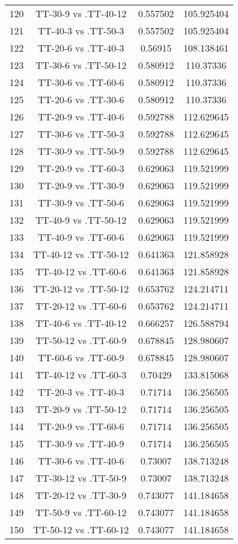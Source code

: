 \documentclass[a4paper,10pt]{article}
\begin{document}
\begin{landscape}
\begin{table}[!htp]
\begin{tabular}{cccc}
120&TT-30-9 vs .TT-40-12&0.557502&105.925404\\
121&TT-40-3 vs .TT-50-3&0.557502&105.925404\\
122&TT-20-6 vs .TT-40-3&0.56915&108.138461\\
123&TT-30-6 vs .TT-50-12&0.580912&110.37336\\
124&TT-30-6 vs .TT-60-6&0.580912&110.37336\\
125&TT-20-6 vs .TT-30-6&0.580912&110.37336\\
126&TT-20-9 vs .TT-40-6&0.592788&112.629645\\
127&TT-30-6 vs .TT-50-3&0.592788&112.629645\\
128&TT-30-9 vs .TT-50-9&0.592788&112.629645\\
129&TT-20-9 vs .TT-60-3&0.629063&119.521999\\
130&TT-20-9 vs .TT-30-9&0.629063&119.521999\\
131&TT-30-9 vs .TT-50-6&0.629063&119.521999\\
132&TT-40-9 vs .TT-50-12&0.629063&119.521999\\
133&TT-40-9 vs .TT-60-6&0.629063&119.521999\\
134&TT-40-12 vs .TT-50-12&0.641363&121.858928\\
135&TT-40-12 vs .TT-60-6&0.641363&121.858928\\
136&TT-20-12 vs .TT-50-12&0.653762&124.214711\\
137&TT-20-12 vs .TT-60-6&0.653762&124.214711\\
138&TT-40-6 vs .TT-40-12&0.666257&126.588794\\
139&TT-50-12 vs .TT-60-9&0.678845&128.980607\\
140&TT-60-6 vs .TT-60-9&0.678845&128.980607\\
141&TT-40-12 vs .TT-60-3&0.70429&133.815068\\
142&TT-20-3 vs .TT-40-3&0.71714&136.256505\\
143&TT-20-9 vs .TT-50-12&0.71714&136.256505\\
144&TT-20-9 vs .TT-60-6&0.71714&136.256505\\
145&TT-30-9 vs .TT-40-9&0.71714&136.256505\\
146&TT-30-6 vs .TT-40-6&0.73007&138.713248\\
147&TT-30-12 vs .TT-50-9&0.73007&138.713248\\
148&TT-20-12 vs .TT-30-9&0.743077&141.184658\\
149&TT-50-9 vs .TT-60-12&0.743077&141.184658\\
150&TT-50-12 vs .TT-60-12&0.743077&141.184658\\

\end{tabular}
\end{table}
\end{landscape}
\end{document}
